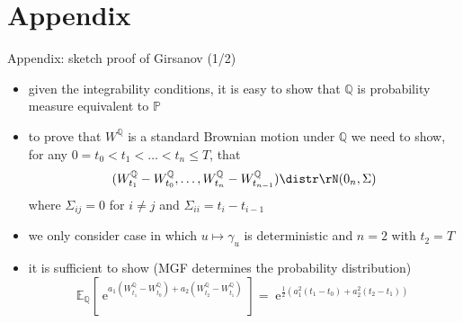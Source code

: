 \documentclass[pdf, handout]{beamer}
\newcommand{\e}{\operatorname{e}}
\begin{document}
\appendix
\section{Appendix}

\begin{frame}{Appendix: sketch proof of Girsanov (1/2)}
\hypertarget{app:girsanov}{}
\begin{itemize}
\item given the integrability conditions, it is easy to show that $\mathbb{Q}$ is probability measure equivalent to $\mathbb{P}$
\item to prove that $W^{\mathbb{Q}}$ is a standard Brownian motion under $\mathbb{Q}$ we need to show, for any $0=t_0<t_1<\dots<t_n\leq T$, that
\[
(W_{t_1}^{\mathbb{Q}} - W_{t_0}^{\mathbb{Q}},\dots,W_{t_n}^{\mathbb{Q}} - W^{\mathbb{Q}}_{t_{n-1}})\distr \rN(0_n, \Sigma)
\]
where $\Sigma_{ij}=0$ for $i\neq j$ 
and $\Sigma_{ii} = t_i -t_{i-1}$
\item we only consider case in which $u\mapsto \gamma_u$ is deterministic and  $n=2$ with $t_2=T$
\item it is sufficient to show (MGF determines the probability distribution)
\[
\mathbb{E}_{\mathbb{Q}}\left[ \e^{a_1 (W^{\mathbb{Q}}_{t_1} - W^{\mathbb{Q}}_{t_0}) + a_2 (W^{\mathbb{Q}}_{t_2} - W^{\mathbb{Q}}_{t_1})}\right]  = \e^{\frac{1}{2}\left(a_1^2(t_1-t_0) + a_2^2(t_2-t_1)
\right)} 
\]
\end{itemize}
\end{frame}
\end{document}
